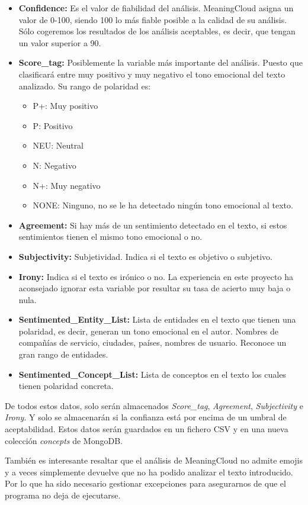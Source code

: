\begin{itemize}
	\item \textbf{Confidence:} Es el valor de fiabilidad del análisis. MeaningCloud asigna un valor de 0-100, siendo 100 lo más fiable posible a la calidad de su análisis. Sólo cogeremos los resultados de los análisis aceptables, es decir, que tengan un valor superior a 90.
	\item \textbf{Score\_tag:} Posiblemente la variable más importante del análisis. Puesto que clasificará entre muy positivo y muy negativo el tono emocional del texto analizado. Su rango de polaridad es: 
	\begin{itemize}
		\item P+: Muy positivo
		\item P: Positivo
		\item NEU: Neutral
		\item N: Negativo
		\item N+: Muy negativo
		\item NONE: Ninguno, no se le ha detectado ningún tono emocional al texto.
	\end{itemize}
	\item \textbf{Agreement:} Si hay más de un sentimiento detectado en el texto, si estos sentimientos tienen el mismo tono emocional o no. 
	\item \textbf{Subjectivity:} Subjetividad. Indica si el texto es objetivo o subjetivo.
	\item \textbf{Irony:} Indica si el texto es irónico o no. La experiencia en este proyecto ha aconsejado ignorar esta variable por resultar su tasa de acierto muy baja o nula. 
	\item \textbf{Sentimented\_Entity\_List:} Lista de entidades en el texto que tienen una polaridad, es decir, generan un tono emocional en el autor. Nombres de compañías de servicio, ciudades, países, nombres de usuario. Reconoce un gran rango de entidades. 
	\item \textbf{Sentimented\_Concept\_List:} Lista de conceptos en el texto los cuales tienen polaridad concreta. 
\end{itemize}

De todos estos datos, solo serán almacenados \textit{Score\_tag}, \textit{Agreement}, \textit{Subjectivity} e \textit{Irony}.  Y solo se almacenarán si la confianza está por encima de un umbral de aceptabilidad. Estos datos serán guardados en un fichero CSV y en una nueva colección \textit{concepts} de MongoDB. 

También es interesante resaltar que el análisis de MeaningCloud\cite{MeaningCloud} no admite emojis y a veces simplemente devuelve que no ha podido analizar el texto introducido. Por lo que ha sido necesario gestionar excepciones para asegurarnos de que el programa no deja de ejecutarse.


